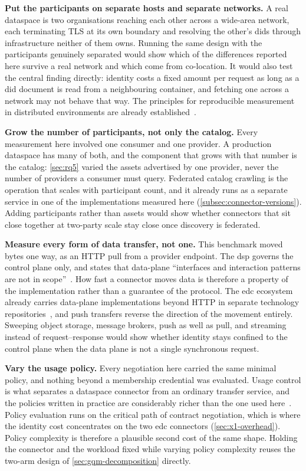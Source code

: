 \textbf{Put the participants on separate hosts and separate networks.} A real dataspace is
two organisations reaching each other across a wide-area network, each terminating TLS at its
own boundary and resolving the other's \glspl{did} through infrastructure neither of them
owns. Running the same design with the participants genuinely separated would show which of
the differences reported here survive a real network and which come from co-location. It
would also test the central finding directly: identity costs a fixed amount per request as
long as a \gls{did} document is read from a neighbouring container, and fetching one across a
network may not behave that way. The principles for reproducible measurement in distributed
environments are already established~\citep{papadopoulos2021reproducible}.

\pagebreak

\textbf{Grow the number of participants, not only the catalog.} Every measurement here
involved one consumer and one provider. A production dataspace has many of both, and the
component that grows with that number is the catalog: \cref{sec:rq5} varied the assets
advertised by one provider, never the number of providers a consumer must query. Federated
catalog crawling is the operation that scales with participant count, and it already runs as
a separate service in one of the implementations measured here
(\cref{subsec:connector-versions}). Adding participants rather than assets would show whether
connectors that sit close together at two-party scale stay close once discovery is federated.

\textbf{Measure every form of data transfer, not one.} This benchmark moved bytes one way, as
an HTTP pull from a provider endpoint. The \gls{dsp} governs the control plane only, and states that data-plane ``interfaces and interaction patterns are not in scope''~\citep{datapsaceProtocol2025}. How fast a connector moves data is therefore a property of the implementation rather than a guarantee of the protocol. The \gls{edc} ecosystem already carries data-plane implementations beyond
HTTP in separate technology repositories~\citep{eclipseEdcTechnologyAws}, and push transfers
reverse the direction of the movement entirely. Sweeping object storage, message brokers, push
as well as pull, and streaming instead of request--response would show whether identity stays
confined to the control plane when the data plane is not a single synchronous request.

\textbf{Vary the usage policy.} Every negotiation here carried the same minimal policy, and
nothing beyond a membership credential was evaluated. Usage control is what separates a
dataspace connector from an ordinary transfer service, and the policies written in practice
are considerably richer than the one used here~\citep{dam2023policypatterns}. Policy evaluation runs on the critical path of contract negotiation, which is where the identity cost concentrates on the two \gls{edc} connectors (\cref{sec:x1-overhead}). Policy complexity is therefore a plausible second cost of the same shape. Holding the connector and the workload fixed while
varying policy complexity reuses the two-arm design of \cref{sec:gqm-decomposition} directly.
